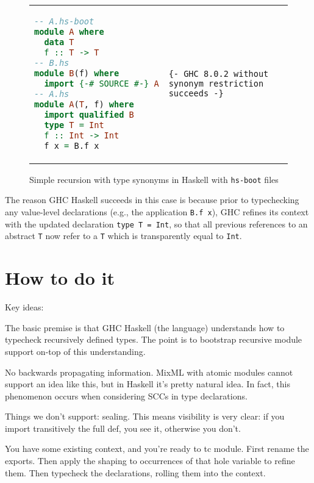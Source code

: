 \begin{figure}[H]
\begin{tabular}{p{} p{}}
\begin{lstlisting}[language=Haskell,escapechar=@]
-- A.hs-boot
module A where
  data T
  f :: T -> T
-- B.hs
module B(f) where
  import {-# SOURCE #-} A
-- A.hs
module A(T, f) where
  import qualified B
  type T = Int
  f :: Int -> Int
  f x = B.f x
\end{lstlisting}
&
\begin{verbatim}
{- GHC 8.0.2 without synonym restriction succeeds -}
\end{verbatim}
\end{tabular}
\caption{Simple recursion with type synonyms in Haskell with \texttt{hs-boot} files}
\label{fig:double-vision-simple-recursion-with-type-synonyms-haskell-hs-boot}
\end{figure}

\noindent
The reason GHC Haskell succeeds in this case is because prior to typechecking
any value-level declarations (e.g., the application \verb|B.f x|), GHC refines
its context with the updated declaration \verb|type T = Int|, so that all
previous references to an abstract \verb|T| now refer to a \verb|T| which
is transparently equal to \verb|Int|.

\section{How to do it}

Key ideas:

The basic premise is that GHC Haskell (the language) understands how to
typecheck recursively defined types.  The point is to bootstrap recursive
module support on-top of this understanding.



No backwards propagating information.  MixML with atomic modules cannot support
an idea like this, but in Haskell it's pretty natural idea. In fact, this phenomenon
occurs when considering SCCs in type declarations.

Things we don't support: sealing.  This means visibility is very clear:
if you import transitively the full def, you see it, otherwise you don't.

You have some existing context, and you're ready to tc module.
First rename the exports. Then apply the shaping to occurrences
of that hole variable to refine them.  Then typecheck the declarations,
rolling them into the context.


